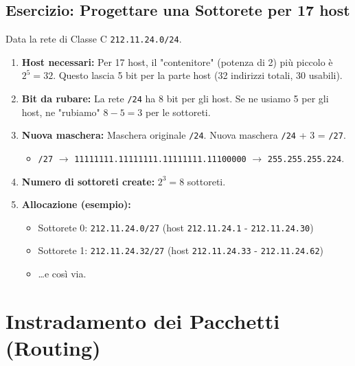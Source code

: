 \documentclass{article}
\begin{document}
\subsection{Esercizio: Progettare una Sottorete per 17 host}
Data la rete di Classe C \texttt{212.11.24.0/24}.
\begin{enumerate}
    \item \textbf{Host necessari:} Per 17 host, il "contenitore" (potenza di 2) più piccolo è $2^5 = 32$. Questo lascia 5 bit per la parte host (32 indirizzi totali, 30 usabili).
    \item \textbf{Bit da rubare:} La rete \texttt{/24} ha 8 bit per gli host. Se ne usiamo 5 per gli host, ne "rubiamo" $8 - 5 = 3$ per le sottoreti.
    \item \textbf{Nuova maschera:} Maschera originale \texttt{/24}. Nuova maschera \texttt{/24} + 3 = \texttt{/27}.
    \begin{itemize}
        \item \texttt{/27} $\rightarrow$ \texttt{11111111.11111111.11111111.11100000} $\rightarrow$ \texttt{255.255.255.224}.
    \end{itemize}
    \item \textbf{Numero di sottoreti create:} $2^3 = 8$ sottoreti.
    \item \textbf{Allocazione (esempio):}
    \begin{itemize}
        \item Sottorete 0: \texttt{212.11.24.0/27} (host \texttt{212.11.24.1} - \texttt{212.11.24.30})
        \item Sottorete 1: \texttt{212.11.24.32/27} (host \texttt{212.11.24.33} - \texttt{212.11.24.62})
        \item \dots e così via.
    \end{itemize}
\end{enumerate}

\section{Instradamento dei Pacchetti (Routing)}
\end{document}
